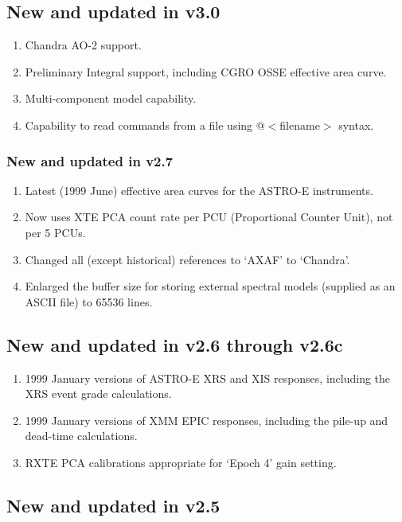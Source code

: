 \documentclass[11pt]{article}
\begin{document}
\begin{appendices}
\subsection{New and updated in v3.0}

\begin{enumerate}
\item Chandra AO-2 support.
\item Preliminary Integral support, including CGRO OSSE effective area curve.
\item Multi-component model capability.
\item Capability to read commands from a file using @$<$filename$>$ syntax.
\end{enumerate}

\subsubsection{New and updated in v2.7}

\begin{enumerate}
\item Latest (1999 June) effective area curves for the ASTRO-E instruments.
\item Now uses XTE PCA count rate per PCU (Proportional Counter Unit), not
	per 5 PCUs.
\item Changed all (except historical) references to `AXAF' to `Chandra'.
\item Enlarged the buffer size for storing external spectral models
	(supplied as an ASCII file) to 65536 lines.
\end{enumerate}

\subsection{New and updated in v2.6 through v2.6c}

\begin{enumerate}
\item 1999 January versions of ASTRO-E XRS and XIS responses, including the
  XRS event grade calculations.
\item 1999 January versions of XMM EPIC responses, including the pile-up and
  dead-time calculations.
\item RXTE PCA calibrations appropriate for `Epoch 4' gain setting.
\end{enumerate}

\subsection{New and updated in v2.5}


\end{appendices}
\end{document}
